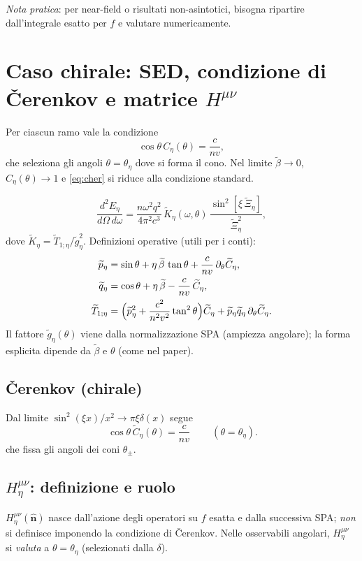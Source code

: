 \documentclass[11pt,a4paper]{article}
\newcommand{\wt}[1]{\widetilde{#1}}
\newcommand{\vv}{v}
\newcommand{\cc}{c}
\newcommand{\nn}{n}
\newcommand{\om}{\omega}
\newcommand{\bn}{\hat{\mathbf n}}
\newcommand{\Xit}{\wt{\Xi}}
\newcommand{\Ct}{\wt{C}}
\newcommand{\Kt}{\wt{K}}
\newcommand{\gt}{\wt{g}}
\newcommand{\pt}{\wt{p}}
\newcommand{\qt}{\wt{q}}
\newcommand{\Tt}{\wt{T}}
\newcommand{\betat}{\wt{\beta}} %
\newcommand{\bbeta}{\tilde{\beta}}          %
\newcommand{\Ceta}{C_{\eta}}
\begin{document}
\bigskip
\noindent\textit{Nota pratica}: per near-field o risultati non-asintotici, bisogna ripartire dall'integrale esatto per $f$ e valutare numericamente.

\section{Caso chirale: SED, condizione di Čerenkov e matrice $H^{\mu\nu}$}
Per ciascun ramo vale la condizione
\begin{equation}\label{eq:cher}
\cos\theta\,\Ceta(\theta)=\frac{c}{n v},
\end{equation}
che seleziona gli angoli $\theta=\theta_{\eta}$ dove si forma il cono. Nel limite $\bbeta\to0$, $\Ceta(\theta)\to 1$ e \eqref{eq:cher} si riduce alla condizione standard.

\begin{equation}
\frac{d^2E_\eta}{d\Omega\,d\om}=\frac{\nn\om^2 q^2}{4\pi^2 \cc^3}\,
\Kt_\eta(\om,\theta)\,\frac{\sin^2[\xi\,\Xit_\eta]}{\Xit_\eta^2},
\end{equation}
dove $\Kt_\eta=\Tt_{1;\eta}/\gt_\eta^2$. Definizioni operative (utili per i conti):
\begin{align}
\pt_\eta&=\sin\theta+\eta\,\betat\,\tan\theta+\frac{\cc}{\nn\vv}\,\partial_\theta \Ct_\eta,\\
\qt_\eta&=\cos\theta+\eta\,\betat-\frac{\cc}{\nn\vv}\,\Ct_\eta,\\
\Tt_{1;\eta}&=\Bigl(\pt_\eta^2+\frac{\cc^2}{\nn^2\vv^2}\tan^2\theta\Bigr)\Ct_\eta+\pt_\eta\qt_\eta\,\partial_\theta \Ct_\eta.
\end{align}
Il fattore $\gt_\eta(\theta)$ viene dalla normalizzazione SPA (ampiezza angolare); la forma esplicita dipende da $\betat$ e $\theta$ (come nel paper).

\subsection{Čerenkov (chirale)}
Dal limite $\sin^2(\xi x)/x^2\to\pi\xi \delta(x)$ segue
\begin{equation}
\boxed{\ \cos\theta\,\Ct_\eta(\theta)=\frac{\cc}{\nn \vv}\ }\qquad (\theta=\theta_\eta).
\end{equation}
che fissa gli angoli dei coni $\theta_\pm$.

\subsection*{\texorpdfstring{$H^{\mu\nu}_\eta$}{H^{munu}\_eta}: definizione e ruolo}
$H^{\mu\nu}_\eta(\bn)$ nasce dall'azione degli operatori su $f$ esatta e dalla successiva SPA; \emph{non} si definisce imponendo la condizione di \v{C}erenkov. Nelle osservabili angolari, $H^{\mu\nu}_\eta$ si \emph{valuta} a $\theta=\theta_\eta$ (selezionati dalla $\delta$).
\end{document}
